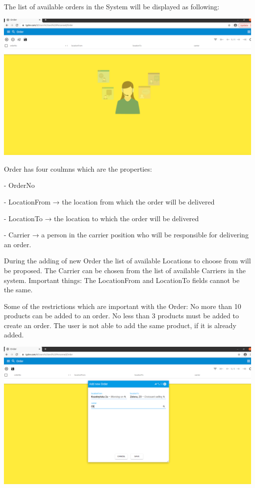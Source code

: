The list of available orders in the System will be displayed as following:

\includegraphics[width=\textwidth]{sections/01-chapter/images/order3.png}

Order has four coulmns which are the properties:

- OrderNo

- LocationFrom → the location from which the order will be delivered

- LocationTo → the location to which the order will be delivered

- Carrier → a person in the carrier position who will be responsible for delivering an order.

During the adding of new Order the list of available Locations to choose from will be proposed. The Carrier can be chosen from the list of available Carriers in the system.
Important things: The LocationFrom and LocationTo fields cannot be the same.

Some of the restrictions which are important with the Order:
No more than 10 products can be added to an order.
No less than 3 products must be added to create an order.
The user is not able to add the same product, if it is already added.

\includegraphics[width=\textwidth]{sections/01-chapter/images/order4.png}


